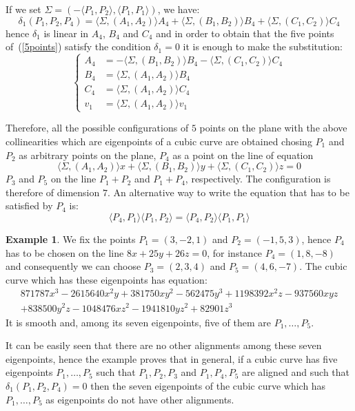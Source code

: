 \documentclass{amsart}
\theoremstyle{plain}
\theoremstyle{definition}
\newtheorem{example}[theorem]{Example}
\newcommand{\scl}[2]{\langle #1, #2 \rangle}
\begin{document}
If we set $\Sigma = \left(-\scl{P_1}{P_2}, \scl{P_1}{P_1}\right)$, we have:
\[
\delta_1(P_1, P_2, P_4) = \scl{\Sigma}{(A_1, A_2)}A_4+
\scl{\Sigma}{(B_1, B_2)}B_4+
\scl{\Sigma}{(C_1, C_2)}C_4
\]
hence $\delta_1$ 
is linear in $A_4$, $B_4$ and $C_4$ and in order to obtain that the five
points of~(\ref{5points}) satisfy the condition $\delta_1=0$ it is
enough to make the substitution:
\begin{equation}
\left\{
\begin{array}{cl}
  A_4 &= -\scl{\Sigma}{(B_1, B_2)}B_4-\scl{\Sigma}{(C_1, C_2)}C_4\\
  B_4 &= \scl{\Sigma}{(A_1, A_2)}B_4\\
  C_4 &= \scl{\Sigma}{(A_1, A_2)}C_4\\
  v_1 &= \scl{\Sigma}{(A_1, A_2)}v_1
\end{array}
\right.
\label{sst}
\end{equation}

Therefore, all the possible configurations of $5$ points on the plane
with the above collinearities which are eigenpoints of a cubic curve
are obtained chosing $P_1$ and $P_2$ as arbitrary points
on the plane, $P_4$ as a point on the line of equation
\[
\scl{\Sigma}{(A_1, A_2)}x+
\scl{\Sigma}{(B_1, B_2)}y+
\scl{\Sigma}{(C_1, C_2)}z = 0
\]
$P_3$ and $P_5$ on the line $P_1+P_2$ and $P_1+P_4$, respectively. The
configuration is therefore of dimension $7$. An alternative way to
write the equation that has to be satisfied by $P_4$ is:
\[
\scl{P_4}{P_1}\scl{P_1}{P_2} = \scl{P_4}{P_2}\scl{P_1}{P_1}
\]

\begin{example}
  \label{exmpl1}
  We fix the points $P_1 = (3, -2, 1)$ and $P_2 = (-1, 5, 3)$,
  hence $P_4$ has to be chosen on the line $8x + 25y + 26z=0$,
  for instance $P_4 = (1, 8, -8)$ and consequently we can choose
  $P_3 = (2, 3, 4)$ and $P_5 = (4, 6, -7)$.
  The cubic curve which has these eigenpoints has equation:
  \[
  \begin{array}{l}
    871787x^3 - 2615640x^2y + 381750xy^2 - 562475y^3 + 1198392x^2z
    - 937560xyz \\
    + 838500y^2z - 1048476xz^2 - 1941810yz^2 + 82901z^3
    \end{array}
  \]
  It is smooth and, among its seven eigenpoints, five of them are
  $P_1, \dots, P_5$.
\end{example}
It can be easily seen that there are no other alignments among these seven
eigenpoints, hence the example proves that in general, if a cubic curve
has five eigenpoints $P_1, \dots, P_5$ such that $P_1, P_2, P_3$ and
$P_1, P_4, P_5$ are aligned and such that $\delta_1(P_1, P_2, P_4) = 0$
then the seven eigenpoints of the cubic curve which has
$P_1, \dots, P_5$ as eigenpoints do not have other alignments.
\end{document}
